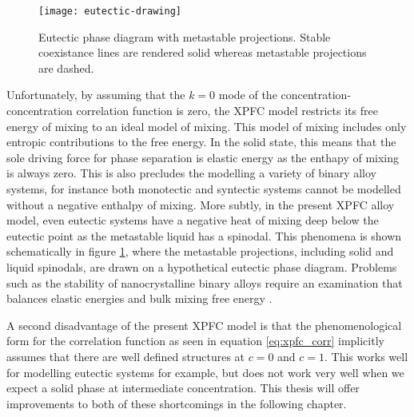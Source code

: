 \begin{figure}
    \centering
    \texttt{[image: eutectic-drawing]}
    \caption[Eutectic Phase Diagram with Metastable Projections]{
        \label{fig:eutectic_drawing} Eutectic phase diagram with metastable
        projections. Stable coexistance lines are rendered solid whereas 
        metastable projections are dashed.
    }
\end{figure}

Unfortunately, by assuming that the $k=0$ mode of the
concentration-concentration correlation function is zero, the XPFC model
restricts its free energy of mixing to an ideal model of mixing. This model of
mixing includes only entropic contributions to the free energy. In the solid
state, this means that the sole driving force for phase separation is elastic
energy as the enthapy of mixing is always zero. This is also precludes the
modelling a variety of binary alloy systems, for instance both monotectic and
syntectic systems cannot be modelled without a negative enthalpy of mixing.
More subtly, in the present XPFC alloy model, even eutectic systems have a
negative heat of mixing deep below the eutectic point as the metastable liquid
has a spinodal. This phenomena is shown schematically in figure
\ref{fig:eutectic_drawing}, where the metastable projections, including solid
and liquid spinodals, are drawn on a hypothetical eutectic phase diagram.
Problems such as the stability of nanocrystalline binary alloys require an
examination that balances elastic energies and bulk mixing free energy
\cite{MURDOCH13}.

A second disadvantage of the present XPFC model is that the phenomenological
form for the correlation function as seen in equation \ref{eq:xpfc_corr}
implicitly assumes that there are well defined structures at $c=0$ and $c=1$.
This works well for modelling eutectic systems for example, but does not work
very well when we expect a solid phase at intermediate concentration. This
thesis will offer improvements to both of these shortcomings in the following
chapter.

